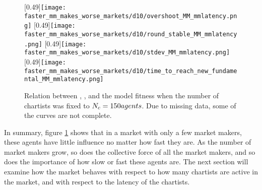 \begin{comment}
\begin{enumerate}
\item When the market has fast chartists, it needs more market makers to keep the market stable, but these may be slow.
\item When the market has fast chartists, the market first of all needs fast market makers to be stable.
\item A market with few market makers can be stable if the market makers are fast, or if the chartists are slow.
\end{enumerate}
\end{comment}


\begin{figure}
	\centering
	\subcaptionbox{\label{fig:faster_mm_makes_worse_markets/d10/overshoot_MM_mmlatency}}
	[0.49\linewidth]{\texttt{[image: faster\_mm\_makes\_worse\_markets/d10/overshoot\_MM\_mmlatency.png]}}
	\subcaptionbox{\label{fig:faster_mm_makes_worse_markets/d10/round_stable_MM_mmlatency}}
	[0.49\linewidth]{\texttt{[image: faster\_mm\_makes\_worse\_markets/d10/round\_stable\_MM\_mmlatency.png]}}
	\subcaptionbox{\label{fig:faster_mm_makes_worse_markets/d10/stdev_MM_mmlatency}}
	[0.49\linewidth]{\texttt{[image: faster\_mm\_makes\_worse\_markets/d10/stdev\_MM\_mmlatency.png]}}
	\subcaptionbox{\label{fig:faster_mm_makes_worse_markets/d10/time_to_reach_new_fundamental_MM_mmlatency}}
	[0.49\linewidth]{\texttt{[image: faster\_mm\_makes\_worse\_markets/d10/time\_to\_reach\_new\_fundamental\_MM\_mmlatency.png]}}
	\caption{Relation between \ssmmnAgents, \ssmmlatencymu, and the model fitness when the number of chartists was fixed to $N_{c} = 150 agents$. Due to missing data, some of the curves are not complete.}
	\label{fig:faster_mm_makes_worse_markets/d10/MM_mmlatency}
\end{figure}

In summary, figure \ref{fig:faster_mm_makes_worse_markets/d10/MM_mmlatency} shows that in a market with only a few market makers, these agents have little influence no matter how fast they are. As the number of market makers grow, so does the collective force of all the market makers, and so does the importance of how slow or fast these agents are. The next section will examine how the market behaves with respect to how many chartists are active in the market, and with respect to the latency of the chartists.



